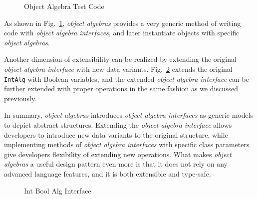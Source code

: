 \begin{figure}[t]
\nocaptionrule
\caption{Object Algebra Test Code}
\label{oa_test_code}
\end{figure}

As shown in Fig.~\ref{oa_test_code}, \emph{object algebras} provides a very generic method of writing code with \emph{object algebra interfaces}, and later instantiate objects with specific \emph{object algebras}.

Another dimension of extensibility can be realized by extending the original \emph{object algebra interface} with new data variants. Fig.~\ref{int_bool_alg_interface} extends the original \lstinline{IntAlg} with Boolean variables, and the extended \emph{object algebra interface} can be further extended with proper operations in the same fashion as we discussed previously.

In summary, \emph{object algebras} introduces \emph{object algebra interfaces} as generic models to depict abstract structures. Extending the \emph{object algebra interface} allows developers to introduce new data variants to the original structure, while implementing methods of \emph{object algebra interfaces} with specific class parameters give developers flexibility of extending new operations. What makes \emph{object algebras} a useful design pattern even more is that it does not rely on any advanced language features, and it is both extensible and type-safe.

\begin{figure}[t]
\nocaptionrule
\caption{Int Bool Alg Interface}
\label{int_bool_alg_interface}
\end{figure}

\begin{comment}

This paper showed how various types of traversals for complex
structures can be automatically provided by \Name. \name traversals are
written directly in Java and are type-safe, extensible and separately
compilable. There has always been a tension between the
correctness guarantees of static typing, and the flexibility of
untyped/dynamically-typed approaches. \name shows that even
in type systems like Java's, it is possible to get considerable
flexibility and adaptability for the problem of boilerplate code in
traversals of complex structures, without giving up modular static typing.

There are many of avenues for future work. One area of research is to
extend \name traversals to support flexible traversal strategies,
similarly to strategic
programming~\cite{borovansky1996elan,visser1998core,vandenBrand:2003:TRT:941566.941568}. Another
line of work worth exploring is to adopt generalizations of object
algebras~\cite{oliveira13fop} for added expressiveness of \name
traversals.

\end{comment}
